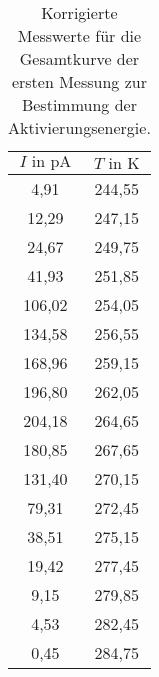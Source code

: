 \FloatBarrier

\begin{table}
  \centering
  \caption{Korrigierte Messwerte für die Gesamtkurve der ersten Messung zur Bestimmung der Aktivierungsenergie.}
  \label{tab:lnlinfit1}
  \begin{tabular}{c c}
    \toprule
    $I \text{ in } \si{\pico\ampere}$ & $ T \text{ in } \si{\kelvin} $ \\
    \midrule
      4,91 & 244,55\\
     12,29 & 247,15\\
     24,67 & 249,75\\
     41,93 & 251,85\\
    106,02 & 254,05\\
    134,58 & 256,55\\
    168,96 & 259,15\\
    196,80 & 262,05\\
    204,18 & 264,65\\
    180,85 & 267,65\\
    131,40 & 270,15\\
     79,31 & 272,45\\
     38,51 & 275,15\\
     19,42 & 277,45\\
      9,15 & 279,85\\
      4,53 & 282,45\\
      0,45 & 284,75\\
    \bottomrule
  \end{tabular}
\end{table}
\FloatBarrier



